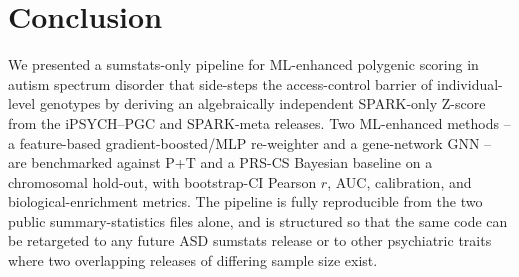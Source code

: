 \section{Conclusion}
\label{sec:conclusion}

We presented a sumstats-only pipeline for ML-enhanced polygenic scoring
in autism spectrum disorder that side-steps the access-control barrier
of individual-level genotypes by deriving an algebraically independent
SPARK-only Z-score from the iPSYCH--PGC and SPARK-meta releases. Two
ML-enhanced methods -- a feature-based gradient-boosted/MLP re-weighter
and a gene-network GNN -- are benchmarked against P+T and a PRS-CS
Bayesian baseline on a chromosomal hold-out, with bootstrap-CI Pearson
$r$, AUC, calibration, and biological-enrichment metrics. The pipeline
is fully reproducible from the two public summary-statistics files
alone, and is structured so that the same code can be retargeted to any
future ASD sumstats release or to other psychiatric traits where two
overlapping releases of differing sample size exist.
